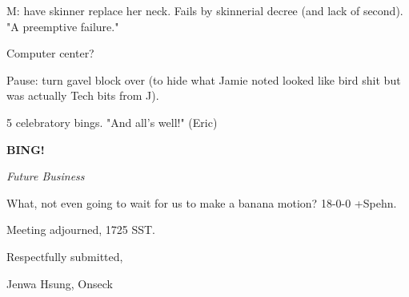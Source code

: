 \documentclass[12pt]{article}
\newcommand{\bing}{{\bf BING!} }
\newcommand{\goto}[1]{\bing \vskip 12pt \centerline{{\em{#1}}}}
\begin{document}
M: have skinner replace her neck. Fails by skinnerial decree (and lack of second). "A preemptive failure."

Computer center?

Pause: turn gavel block over (to hide what Jamie noted looked like bird shit but was actually Tech bits from J).

5 celebratory bings. "And all's well!" (Eric)

\goto{Future Business}

What, not even going to wait for us to make a banana motion? 18-0-0 +Spehn.

\vspace{12pt}

\noindent
Meeting adjourned, 1725 SST.

\vspace{18pt}

\centerline{Respectfully submitted,}
\centerline{Jenwa Hsung, Onseck}
\end{document}
